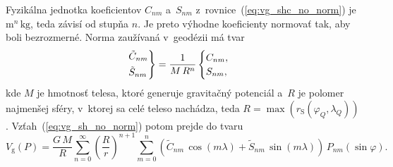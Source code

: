 \documentclass[a4paper, 12pt]{book}
\newcommand{\gidx}{\mathrm g}
\begin{document}
Fyzikálna jednotka koeficientov $C_{nm}$ a~$S_{nm}$
z~rovnice~(\ref{eq:vg_shc_no_norm}) je $\mathrm{m}^n \, \mathrm{kg}$, teda
závisí od stupňa $n$.  Je preto výhodne koeficienty normovať tak, aby boli
bezrozmerné.  Norma zaužívaná v~geodézii má tvar
%
\begin{equation}
\begin{rcases}
\tilde{C}_{nm}\\
\tilde{S}_{nm}
\end{rcases}
= \frac{1}{M \, R^n}
\begin{cases}
C_{nm}{,}\\
S_{nm}{,}
\end{cases}
\end{equation}
%
kde $M$ je hmotnosť telesa, ktoré generuje gravitačný potenciál a~$R$ je
polomer najmenšej sféry, v~ktorej sa celé teleso nachádza, teda $R
= \max(r_\mathrm{S}(\varphi_Q, \lambda_Q))$.  Vzťah~(\ref{eq:vg_sh_no_norm})
potom prejde do tvaru
%
\begin{equation}
\label{eq:vg_sh_1st_norm}
V_\gidx(P) = \frac{G \, M}{R} \sum_{n = 0}^\infty \left( \frac{R}{r} \right)^{n
+ 1} \sum_{m = 0}^{n} \left( \tilde{C}_{nm} \, \cos(m\lambda) + \tilde{S}_{nm}
\, \sin(m\lambda)\right) \, P_{nm}(\sin\varphi){.}
\end{equation}
\end{document}
